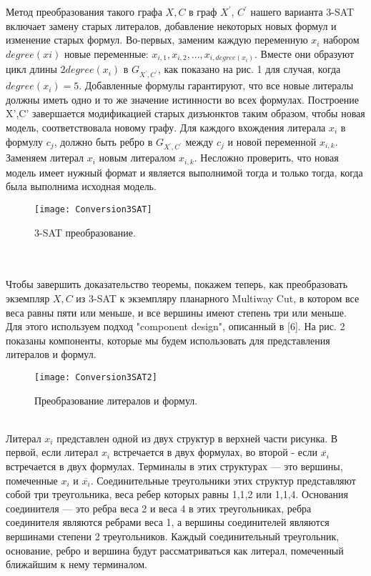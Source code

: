 \\
\\Метод преобразования такого графа \(X, C\) в граф \(X^'\), \(C^'\) нашего варианта 3-SAT включает замену старых литералов, добавление некоторых новых формул и изменение старых формул. Во-первых, заменим каждую переменную \(x_i\) набором \(degree(xi)\) новые переменные:
\(x_{i,1}, x_{i,2}, . . . , x_{i,degree(x_i)}\). Вместе они образуют цикл длины \(2degree(x_i)\) в \(G_{X^{'},C^'}\), как показано на рис. 1 для случая, когда \(degree(x_i) = 5\).
Добавленные формулы гарантируют, что все новые литералы должны иметь одно и то же значение истинности во всех формулах. Построение X',C' завершается модификацией старых дизъюнктов таким образом, чтобы новая
модель, соответствовала новому графу. Для каждого вхождения литерала \(x_i\) в формулу \(c_j\), должно быть ребро в \(G_{X^{'},C^{'}}\) между \(c_j\) и новой переменной \(x_{i,k}\). Заменяем литерал \(x_i\)
новым литералом \(x_{i,k}\). Несложно проверить, что новая модель имеет нужный формат
и является выполнимой тогда и только тогда, когда была выполнима исходная модель.
\begin{figure}[hbt!]
\centering
    \texttt{[image: Conversion3SAT]}
    \caption{3-SAT преобразование.}
\end{figure}
\\
\\Чтобы завершить доказательство теоремы, покажем теперь, как преобразовать экземпляр \({X,C}\)
из 3-SAT к экземпляру планарного Multiway Cut, в котором все
веса равны пяти или меньше, и все вершины имеют степень три или меньше. Для этого используем подход "component design", описанный в [6]. На рис. 2 показаны компоненты, которые мы будем использовать для представления литералов и
формул.
\begin{figure}[hbt!]
\centering
    \texttt{[image: Conversion3SAT2]}
    \caption{Преобразование литералов и формул.}
\end{figure}
\\Литерал \(x_i\) представлен одной из двух структур в верхней части рисунка. В первой, если литерал \(x_i\) встречается в двух формулах, во второй - если  \(\overline{x_i}\) встречается в двух формулах. Терминалы в этих структурах — это вершины, помеченные \(x_i\) и \(\overline{x_i}\). Соединительные треугольники этих структур представляют собой три треугольника, веса ребер которых равны 1,1,2 или 1,1,4.
Основания соединителя — это ребра веса 2 и веса 4 в этих треугольниках, ребра соединителя
являются ребрами веса 1, а вершины соединителей являются вершинами степени 2 треугольников. Каждый соединительный треугольник, основание, ребро и вершина будут рассматриваться как литерал, помеченный ближайшим к нему терминалом.
